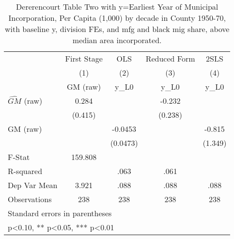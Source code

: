 \begin{table}[htbp]\centering
\def\sym#1{\ifmmode^{#1}\else\(^{#1}\)\fi}
\caption{Dererencourt Table Two with y=Earliest Year of Municipal Incorporation, Per Capita (1,000) by decade in County 1950-70, with baseline y, division FEs, and mfg and black mig share, above median area incorporated.}
\begin{tabular}{l*{4}{c}}
\toprule
                    & First Stage   &         OLS   &Reduced Form   &        2SLS   \\
                    &\multicolumn{1}{c}{(1)}&\multicolumn{1}{c}{(2)}&\multicolumn{1}{c}{(3)}&\multicolumn{1}{c}{(4)}\\
                    &\multicolumn{1}{c}{GM  (raw)}&\multicolumn{1}{c}{y\_L0}&\multicolumn{1}{c}{y\_L0}&\multicolumn{1}{c}{y\_L0}\\
\midrule
$\hat{GM}$ (raw)    &       0.284   &               &      -0.232   &               \\
                    &     (0.415)   &               &     (0.238)   &               \\
\addlinespace
GM  (raw)           &               &     -0.0453   &               &      -0.815   \\
                    &               &    (0.0473)   &               &     (1.349)   \\
\midrule
F-Stat              &     159.808   &               &               &               \\
R-squared           &               &        .063   &        .061   &               \\
Dep Var Mean        &       3.921   &        .088   &        .088   &        .088   \\
Observations        &         238   &         238   &         238   &         238   \\
\bottomrule
\multicolumn{5}{l}{\footnotesize Standard errors in parentheses}\\
\multicolumn{5}{l}{\footnotesize * p<0.10, ** p<0.05, *** p<0.01}\\
\end{tabular}
\end{table}

